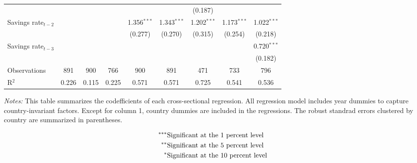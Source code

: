 \begin{table}[h!]
\begin{adjustbox}{max width=\textwidth}
\begin{threeparttable}
\begin{tabular}{lcccccccc}
				&  &  &  &  &  & (0.187) &  &  \\ 
			Savings rate${}_{t-2}$ &  &  &  & 1.356$^{***}$ & 1.343$^{***}$ & 1.202$^{***}$ & 1.173$^{***}$ & 1.022$^{***}$ \\[-1.8ex] 
				&  &  &  & (0.277) & (0.270) & (0.315) & (0.254) & (0.218) \\ 
			Savings rate${}_{t-3}$ &  &  &  &  &  &  &  & 0.720$^{***}$ \\[-1.8ex] 
				&  &  &  &  &  &  &  & (0.182) \\ 
				Observations &\multicolumn{1}{c}{891} & \multicolumn{1}{c}{900} & \multicolumn{1}{c}{766} & \multicolumn{1}{c}{900} & \multicolumn{1}{c}{891} & \multicolumn{1}{c}{471} & \multicolumn{1}{c}{733} & \multicolumn{1}{c}{796} \\ 
				R$^{2}$ &\multicolumn{1}{c}{0.226} & \multicolumn{1}{c}{0.115} & \multicolumn{1}{c}{0.225} & \multicolumn{1}{c}{0.571} & \multicolumn{1}{c}{0.571} & \multicolumn{1}{c}{0.725} & \multicolumn{1}{c}{0.541} & \multicolumn{1}{c}{0.536} \\ 
				\hline
			\end{tabular}
		    \begin{tablenotes}
		    	\item \textit{Notes:} This table summarizes the codefficients of each cross-sectional regression. All regression model includes year dummies to capture country-invariant factors. Except for column 1, country dummies are included in the regressions. The robust standrad errors clustered by country are summarized in parentheses. 
		    	\item \begin{align}
		    	^{***}& \text{Significant at the 1 percent level}\notag\\
		    	^{**}& \text{Significant at the 5 percent level}\notag\\
		    	^{*}& \text{Significant at the 10 percent level}\notag
		    	\end{align}
		    \end{tablenotes}
		\end{threeparttable}
		\end{adjustbox}			
	\end{table} 	


\newpage
